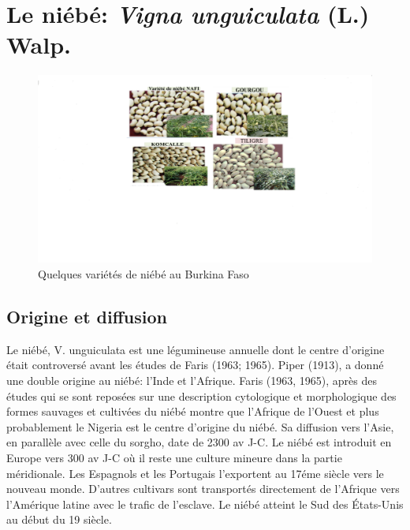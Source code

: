 \documentclass[a4paper,11pt]{article}
\begin{document}
\section{Le niébé: \emph{Vigna unguiculata} (L.) Walp.}
\begin{figure}%
  \begin{center}
   \includegraphics[width=12cm]{images/graines_niebe}
  \end{center}
\caption{Quelques variétés de niébé au Burkina Faso}
\end{figure}

\newpage



\subsection{Origine et diffusion}
Le niébé, V. unguiculata est une légumineuse annuelle dont le centre
d’origine était controversé avant les études de Faris (1963;
1965). Piper (1913), a donné une double origine au niébé: l’Inde et
l’Afrique. Faris (1963, 1965), après des études qui se sont reposées
sur une description cytologique et morphologique des formes sauvages
et cultivées du niébé montre que l’Afrique de l’Ouest et plus
probablement le Nigeria est le centre d’origine du niébé. Sa diffusion
vers l’Asie, en parallèle avec celle du sorgho, date de 2300 av
J-C. Le niébé est introduit en Europe vers 300 av J-C où il reste une
culture mineure dans la partie méridionale. Les Espagnols et les
Portugais l’exportent au 17éme siècle vers le nouveau monde. D’autres
cultivars sont transportés directement de l’Afrique vers l’Amérique
latine avec le trafic de l’esclave. Le niébé atteint le Sud des
États-Unis au début du 19\ieme{} siècle\cite{Sawadogo_2009}.
\end{document}
